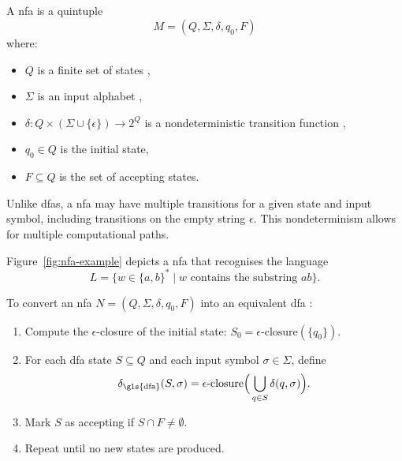 \subsection{}
\label{subsec:nfa}
\begin{definition}
    A \gls{nfa} is a quintuple 
    \[
    M = (Q, \Sigma, \delta, q_0, F)
    \]
    where:
    \begin{itemize}
        \item \( Q \) is a finite set of states \cite{kozen1997automata},
        \item \( \Sigma \) is an input alphabet \cite{sudkamp2006languages},
        \item \( \delta: Q \times (\Sigma \cup \{\epsilon\}) \rightarrow 2^Q \) is a nondeterministic transition function \cite{hopcroft2006introduction},
        \item \( q_0 \in Q \) is the initial state,
        \item \( F \subseteq Q \) is the set of accepting states.
    \end{itemize}
\end{definition}

\begin{remark}
Unlike \glspl{dfa}, a \gls{nfa} may have multiple transitions for a given state and input symbol, including transitions on the empty string \(\epsilon\). This nondeterminism allows for multiple computational paths.
\end{remark}

\begin{example}
Figure~\ref{fig:nfa-example} depicts a \gls{nfa} that recognises the language 
\[
L = \{ w \in \{a,b\}^* \mid w \text{ contains the substring } ab \}.
\]
\end{example}

\begin{algorithm}
\label{alg:subset}
To convert an \gls{nfa} \( N = (Q, \Sigma, \delta, q_0, F) \) into an equivalent \gls{dfa} \cite{hopcroft2006introduction, kozen1997automata}:
\begin{enumerate}
    \item Compute the \(\epsilon\)-closure of the initial state: \( S_0 = \epsilon\text{-closure}(\{q_0\}) \).
    \item For each \gls{dfa} state \( S \subseteq Q \) and each input symbol \(\sigma \in \Sigma\), define 
    \[
    \delta_{\text{\gls{dfa}}}(S, \sigma) = \epsilon\text{-closure}\Big(\bigcup_{q \in S} \delta(q, \sigma)\Big).
    \]
    \item Mark \( S \) as accepting if \( S \cap F \neq \emptyset \).
    \item Repeat until no new states are produced.
\end{enumerate}
\end{algorithm}

